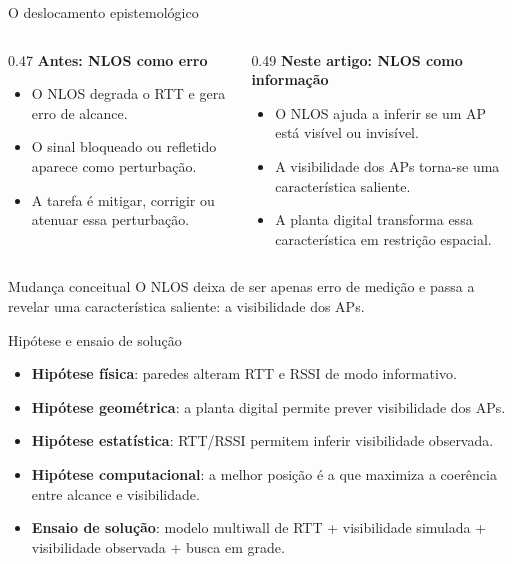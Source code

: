 \documentclass[aspectratio=169,11pt]{beamer}
\begin{document}
\begin{frame}{O deslocamento epistemológico}
  \footnotesize
  \begin{columns}[T]
    \begin{column}{0.47\textwidth}
      \textbf{Antes: NLOS como erro}
      \begin{itemize}
        \item O NLOS degrada o RTT e gera erro de alcance.
        \item O sinal bloqueado ou refletido aparece como perturbação.
        \item A tarefa é mitigar, corrigir ou atenuar essa perturbação.
      \end{itemize}
    \end{column}
    \begin{column}{0.49\textwidth}
      \textbf{Neste artigo: NLOS como informação}
      \begin{itemize}
        \item O NLOS ajuda a inferir se um AP está visível ou invisível.
        \item A visibilidade dos APs torna-se uma característica saliente.
        \item A planta digital transforma essa característica em restrição espacial.
      \end{itemize}
    \end{column}
  \end{columns}

  \vspace{0.25cm}
  \begin{alertblock}{Mudança conceitual}
    O NLOS deixa de ser apenas erro de medição e passa a revelar uma característica saliente: a visibilidade dos APs.
  \end{alertblock}

\end{frame}

\begin{frame}{Hipótese e ensaio de solução}
  \footnotesize
  \begin{itemize}
    \setlength{\itemsep}{0.25cm}
    \item \textbf{Hipótese física}: paredes alteram RTT e RSSI de modo informativo.
    \item \textbf{Hipótese geométrica}: a planta digital permite prever visibilidade dos APs.
    \item \textbf{Hipótese estatística}: RTT/RSSI permitem inferir visibilidade observada.
    \item \textbf{Hipótese computacional}: a melhor posição é a que maximiza a coerência entre alcance e visibilidade.
    \item \textbf{Ensaio de solução}: modelo multiwall de RTT + visibilidade simulada + visibilidade observada + busca em grade.
  \end{itemize}

\end{frame}
\end{document}
